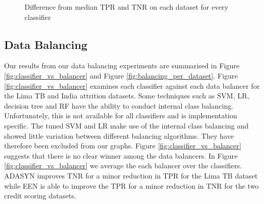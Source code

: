 \documentclass{sig-alternate-05-2015}
\begin{document}
	\begin{figure}
		\hspace*{2em}
		\centering
		\caption{Difference from median TPR and TNR on each dataset for every classifier}
		\label{fig:classifier_comparision}
	\end{figure}
	
	\subsection{Data Balancing}
	Our results from our data balancing experiments are summarised in Figure \ref{fig:classifier_vs_balancer} and Figure \ref{fig:balancing_per_dataset}. Figure \ref{fig:classifier_vs_balancer} examines each classifier against each data balancer for the Lima TB and India attrition datasets. Some techniques such as SVM, LR, decision tree and RF have the ability to conduct internal class balancing. Unfortunately, this is not available for all classifiers and is implementation specific. The tuned SVM and LR make use of the internal class balancing and showed little variation between different balancing algorithms. They have therefore been excluded from our graphs. Figure \ref{fig:classifier_vs_balancer} suggests that there is no clear winner among the data balancers. In Figure \ref{fig:classifier_vs_balancer} we average the each balancer over the classifiers. ADASYN improves TNR for a minor reduction in TPR for the Lima TB dataset while EEN is able to improve the TPR for a minor reduction in TNR for the two credit scoring datasets.
	
\end{document}
